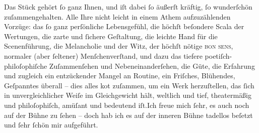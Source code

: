 \pstart
           Das Stück gehört{ }ſo ganz Ihnen, und iſt dabei{ }ſo äußerſt kräftig,{ }ſo wunderſchön
               zuſammengehalten. Alle Ihre nicht leicht in einem Athem aufzuzählenden Vorzüge: das{ }ſo ganz perſönliche Lebensgefühl, die höchſt beſondere Scala der Wertungen, {\pb}die zarte und{ }ſichere Geſtaltung,
               die leichte Hand für die Scenenführung, die Melancholie und der Witz, der höchſt
               nötige \textsc{bon sens}, normaler (aber{ }ſeltener) Menſchenverſtand,
               und dazu das tiefere poetiſch-philoſophiſche Zuſammenſehen und Nebeneinanderſehen,
               die Güte, die Erfahrung und zugleich ein entzückender Mangel an Routine, ein
               Friſches, Blühendes, Geſpanntes überall – dies alles ko{\geminationm}t zuſammen, um ein {\pb}Werk
               herzuſtellen, das{ }ſich in unvergleichlicher Weiſe im Gleichgewicht hält, weltlich und
               tief, theatermäßig und philoſophiſch, amüſant und bedeutend iſt.\hspace*{1.5em}Ich freue mich{ }ſehr, es auch noch auf der Bühne zu{ }ſehen – doch hab
               ich es auf der inneren Bühne tadellos beſetzt und{ }ſehr{ }ſchön mir aufgeführt.\pend
           
